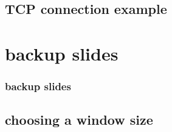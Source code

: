 
%

\subsection{TCP connection example}






\section{backup slides}
\begin{frame}\frametitle{backup slides}
\end{frame}
\subsection{choosing a window size}







